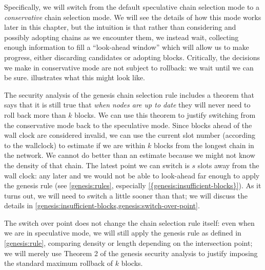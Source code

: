 Specifically, we will switch from the default speculative chain selection mode
to a \emph{conservative} chain selection mode. We will see the details of how
this mode works later in this chapter, but the intuition is that rather than
considering and possibly adopting chains as we encounter them, we instead wait,
collecting enough information to fill a ``look-ahead window'' which will allow
us to make progress, either discarding candidates or adopting blocks.
Critically, the decisions we make in conservative mode are not subject to
rollback: we wait until we can be sure. 
illustrates what this might look like.

The security analysis of the genesis chain selection rule includes a theorem
\cite[Theorem 2]{cryptoeprint:2018:378} that says that it is still true that
\emph{when nodes are up to date} they will never need to roll back more than $k$
blocks. We can use this theorem to justify switching from the conservative
mode back to the speculative mode. Since blocks ahead of the wall clock are
considered invalid, we can use the current slot number (according to the
wallclock) to estimate if we are within $k$ blocks from the longest chain
in the network. We cannot do better than an estimate because we might not know
the density of that chain. The latest point we can switch is $s$ slots away
from the wall clock: any later and we would not be able to look-ahead far enough
to apply the genesis rule (see \cref{genesis:rules}, especially
\cref{{genesis:insufficient-blocks}}). As it turns out, we will need to switch a
little sooner than that; we will discuss the details in
\cref{genesis:insufficient-blocks,genesis:switch-over-point}.

The switch over point does not change the chain selection rule itself: even when
we are in speculative mode, we will still apply the genesis rule as defined in
\cref{genesis:rule}, comparing density or length depending on the intersection
point; we will merely use Theorem 2 of the genesis security analysis to justify
imposing the standard maximum rollback of $k$ blocks.

